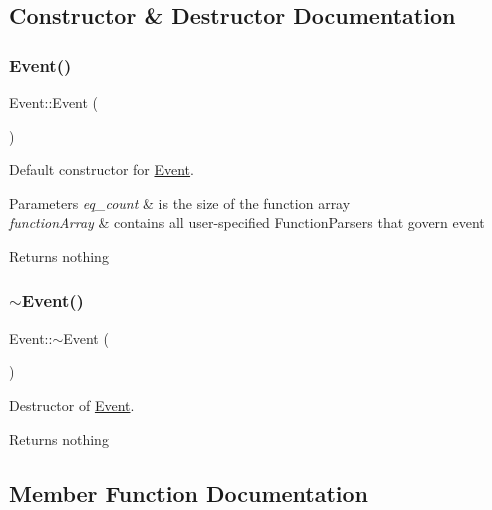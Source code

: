 \subsection{Constructor \& Destructor Documentation}
\mbox{\label{class_event_a5a40dd4708297f7031e29b39e039ae10}} 
\subsubsection{\texorpdfstring{Event()}{Event()}}
{\footnotesize\ttfamily Event\+::\+Event (\begin{DoxyParamCaption}{ }\end{DoxyParamCaption})}



Default constructor for \hyperlink{class_event}{Event}. 


\begin{DoxyParams}{Parameters}
{\em eq\+\_\+count} & is the size of the function array \\
\hline
{\em function\+Array} & contains all user-\/specified Function\+Parsers that govern event \\
\hline
\end{DoxyParams}
\begin{DoxyReturn}{Returns}
nothing 
\end{DoxyReturn}
\mbox{\label{class_event_a7704ec01ce91e673885792054214b3d2}} 
\subsubsection{\texorpdfstring{$\sim$\+Event()}{~Event()}}
{\footnotesize\ttfamily Event\+::$\sim$\+Event (\begin{DoxyParamCaption}{ }\end{DoxyParamCaption})}



Destructor of \hyperlink{class_event}{Event}. 

\begin{DoxyReturn}{Returns}
nothing 
\end{DoxyReturn}


\subsection{Member Function Documentation}
\mbox{\label{class_event_ad380e41418d2e34b651e052711fefe83}} 
